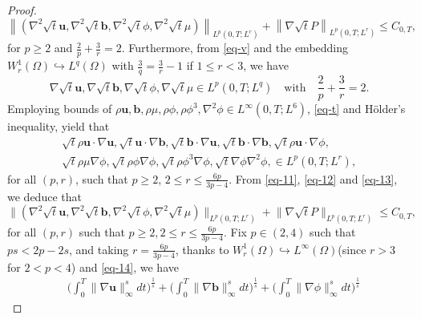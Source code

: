 \documentclass[11pt]{article}
\numberwithin{equation}{section}
\begin{document}
\begin{proof}
\begin{equation}
\left\lVert (\nabla^2 \sqrt{t} \mathbf{u}, \nabla^2 \sqrt{t} \mathbf{b}, \nabla^2 \sqrt{t} \phi,  \nabla^2 \sqrt{t} \mu) \right\rVert_{L^p(0,T;L^r)} + \left\lVert \nabla \sqrt{t} P \right\rVert_{L^p(0,T;L^r)} \leq C_{0,T} ,\label{eq-v}
\end{equation}
for $p \geq 2 $ and $ \frac{2}{p} + \frac{3}{r} = 2 $. Furthermore, from \eqref{eq-v} and the embedding \( W^1_r(\Omega) \hookrightarrow L^q(\Omega) \) with \( \frac{3}{q} = \frac{3}{r} - 1 \) if \( 1 \leq r < 3 \), we have
\begin{equation}
\nabla \sqrt{t} \mathbf{u}, \nabla \sqrt{t} \mathbf{b}, \nabla \sqrt{t} \phi, \nabla \sqrt{t} \mu \in L^p(0, T; L^q)  \quad \text{with} \quad \frac{2}{p} + \frac{3}{r} = 2.\label{eq-t}
\end{equation}
Employing bounds  of \( \rho \mathbf{u}, \mathbf{b}, \rho\mu, \rho\phi, \rho\phi^3, \nabla^2\phi \in L^\infty(0, T; L^6) \), \eqref{eq-t} and H\"older's inequality, yield that
\begin{equation}
\begin{split}
\sqrt{t} \rho \mathbf{u} \cdot \nabla \mathbf{u}, \sqrt{t} \mathbf{u} \cdot \nabla \mathbf{b}, \sqrt{t} \mathbf{b} \cdot \nabla \mathbf{u}, \sqrt{t} \mathbf{b} \cdot \nabla \mathbf{b}, \sqrt{t} \rho \mathbf{u} \cdot \nabla \phi,\label{eq-13}\\
\sqrt{t} \rho \mu \nabla \phi, \sqrt{t} \rho \phi \nabla \phi, \sqrt{t} \rho \phi^3 \nabla \phi, \sqrt{t} \nabla \phi\nabla^2\phi, \in L^p(0, T; L^r),
\end{split}
\end{equation}
for all $(p, r)$, such that $p \geq 2$, $2 \leq r \leq \frac{6p}{3p - 4}$. From \eqref{eq-11}, \eqref{eq-12} and \eqref{eq-13}, we deduce that
\begin{equation}
\bigl\| (\nabla^2 \sqrt{t} \mathbf{u}, \nabla^2 \sqrt{t} \mathbf{b}, \nabla^2 \sqrt{t} \phi, \nabla^2 \sqrt{t} \mu) \bigr\|_{L^p(0, T; L^r)} + \bigl\| \nabla \sqrt{t} P \bigr\|_{L^p(0, T; L^r)} \leq C_{0, T},\label{eq-14}
\end{equation}
for all \( (p, r) \) such that $ p \geq 2, 2\leq r \leq \frac{6p}{3p - 4} $. Fix $p \in (2,4)$ such that $ps < 2p - 2s$,  and taking  $r=\frac{6p}{3p - 4}$,  thanks to $W_r^1(\Omega) \hookrightarrow L^\infty(\Omega)$(since $r > 3$ for $2 < p < 4$) and \eqref{eq-14}, we have
\begin{equation*}
\begin{split}
&\big( \int_0^T \big\lVert \nabla \mathbf{u} \big\rVert_\infty^s dt \big)^{\frac{1}{s}} +\big( \int_0^T \big\lVert \nabla \mathbf{b} \big\rVert_\infty^s dt \big)^{\frac{1}{s}} + \big( \int_0^T \big\lVert \nabla \phi \big\rVert_\infty^s dt \big)^{\frac{1}{s}}

\end{split}
\end{equation*}
\end{proof}
\end{document}
